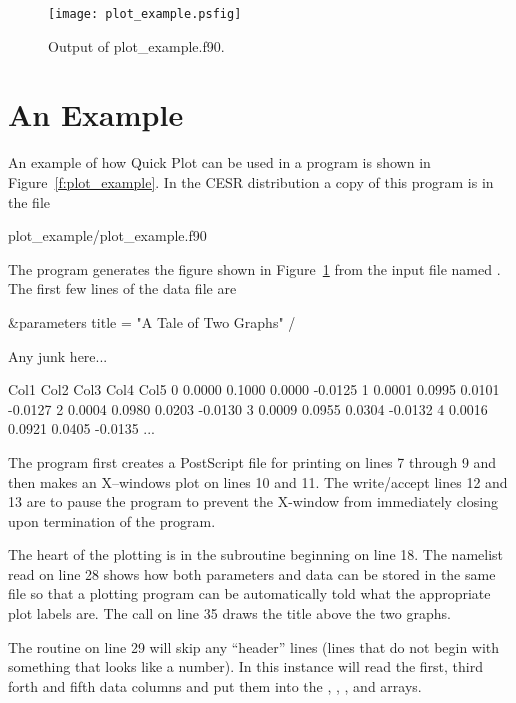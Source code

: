\begin{figure}
\centering
\texttt{[image: plot\_example.psfig]}
\caption{Output of plot\_example.f90.}
\label{f:plot_out}
\end{figure}

\section{An Example}
\label{s:plot_example}

An example of how Quick Plot can be used in a program is shown in
Figure~\ref{f:plot_example}. In the CESR distribution a copy of this
program is in the file
\begin{example}
  plot_example/plot_example.f90
\end{example}
The  program generates the figure shown in
Figure~\ref{f:plot_out} from the input file named . The
first few lines of the data file are
\begin{example}
  \&parameters
    title = "A Tale of Two Graphs"
  /
 
  Any junk here...
 
  Col1      Col2      Col3      Col4      Col5
     0    0.0000    0.1000    0.0000   -0.0125
     1    0.0001    0.0995    0.0101   -0.0127
     2    0.0004    0.0980    0.0203   -0.0130
     3    0.0009    0.0955    0.0304   -0.0132
     4    0.0016    0.0921    0.0405   -0.0135
     ...
\end{example}

The program first creates a PostScript file for printing on lines 7
through 9 and then makes an X--windows plot on lines 10 and 11. The
write/accept lines 12 and 13 are to pause the program to prevent the
X-window from immediately closing upon termination of the program.

The heart of the plotting is in the subroutine  beginning
on line 18. The namelist read on line 28 shows how both parameters and
data can be stored in the same file so that a plotting program can be
automatically told what the appropriate plot labels are. The
 call on line 35 draws the title above the two graphs.

The  routine on line 29 will skip any ``header''
lines (lines that do not begin with something that looks like a
number). In this instance  will read the first, third
forth and fifth data columns and put them into the , ,
, and  arrays.

